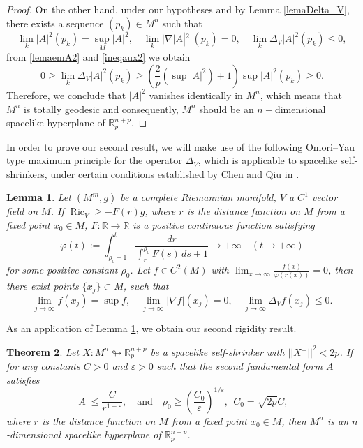 \documentclass[leqno,11pt]{amsart}
\theoremstyle{plain}
\newtheorem{theorem}{\indent\sc Theorem}[section]
\newtheorem{lemma}[theorem]{\indent\sc Lemma}
\theoremstyle{definition}
\numberwithin{equation}{section}
\begin{document}
\begin{proof}
On the other hand, under our hypotheses and by Lemma \ref{lemaDelta_V}, there exists a sequence $(p_k) \in M^n$ such that
\begin{equation}\label{lemaemA2}
\lim_{k} |A|^2(p_k) = \sup_M |A|^2, \quad 
\lim_{k} |\nabla |A|^2 |(p_k) = 0, \quad 
\lim_{k} \Delta_V |A|^2(p_k) \leq 0,
\end{equation}
from \eqref{lemaemA2} and \eqref{ineqaux2} we obtain
$$
0 \geq \lim_{k} \Delta_V |A|^2(p_k) \geq \left( \dfrac{2}{p}(\sup |A|^2) + 1 \right) \sup |A|^2 (p_k) \geq 0.
$$
Therefore, we conclude that $|A|^2$ vanishes identically in $M^n$, which means that $M^n$ is totally geodesic and consequently, $M^n$ should be an $n-$dimensional spacelike hyperplane of $\mathbb{R}^{n+p}_p$.



\end{proof}

In order to prove our second result, we will make use of the following Omori--Yau type maximum principle for the operator $\Delta_V$, which is applicable to spacelike self-shrinkers, under certain conditions established by Chen and Qiu in \cite{QH:16}.


\begin{lemma}\label{lema2}
	Let $(M^m, g)$ be a complete Riemannian manifold, $ V $ a $ C^1 $ vector field on $ M $. If $ \operatorname{Ric}_V \geq -F(r)g$, where $ r $ is the distance function on $ M $ from a fixed point $ x_0 \in M $, $ F: \mathbb{R} \to \mathbb{R} $ is a positive continuous function satisfying
	\begin{equation}\label{maximumprinciple2}
	\varphi(t) := \int_{\rho_0 + 1}^t \frac{dr}{\displaystyle\int_{r}^{\rho_0} F(s) \, ds + 1} \to +\infty \quad (t \to +\infty)
	\end{equation}
	for some positive constant $ \rho_0 $. Let $ f \in C^2(M) $ with $ \displaystyle\lim_{x \to \infty} \frac{f(x)}{\varphi(r(x))} = 0 $, then there exist points \( \{x_j\} \subset M \), such that
	\begin{equation}
	\lim_{j \to \infty} f(x_j) = \sup f, \quad \lim_{j \to \infty} |\nabla f|(x_j) = 0, \quad \lim_{j \to \infty} \Delta_V f(x_j) \leq 0.
	\end{equation}
\end{lemma}


As an application of Lemma \ref{lema2}, we obtain our second rigidity result.

\begin{theorem}
	Let $X:M^n\looparrowright\mathbb R^{n+p}_{p}$ be a spacelike self-shrinker with  $||X^\perp||^2 < 2p$. If for any constants $C>0$ and $\varepsilon > 0$ such that the second fundamental form $A$ satisfies
	$$
	|A| \leq \dfrac{C}{r^{1+\varepsilon}}, \quad \text{and} \quad \rho_0 \geq \left( \dfrac{C_0}{\varepsilon} \right)^{1/\varepsilon},  ~~ C_0 = \sqrt{2p}C,
	$$
	where $ r $ is the distance function on $ M $ from a fixed point $ x_0 \in M $, then $M^n$ is an $n$-dimensional spacelike hyperplane of $\mathbb R^{n+p}_{p}$.
\end{theorem}
\end{document}
